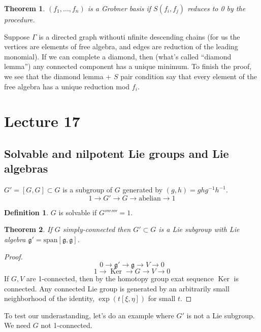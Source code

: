 \documentclass[12 pt]{article}
\DeclareMathOperator {\Ker} {Ker}
\theoremstyle{plain}
\newtheorem*{thm*}{Theorem}
\theoremstyle{definition}
\newtheorem{defn}{Definition}
\theoremstyle{remark}
\begin{document}
\begin{thm*}
$(f_1, \dots , f_n)$ is a Grobner basis if $S(f_i, f_j)$ reduces to 0 by the procedure.
\end{thm*}
Suppose $\Gamma$ is a directed graph withouti nfinite descending chains (for us the vertices are elements of free algebra, and edges are reduction of the leading monomial). If we can complete a diamond, then (what's called ``diamond lemma'') any connected component has a unique minimum. To finish the proof, we see that the diamond lemma + $S$ pair condition say that every element of the free algebra has a unique reduction mod $f_i$.




\section*{Lecture 17}
\subsection*{Solvable and nilpotent Lie groups and Lie algebras}
$G' = [G,G] \subset G$ is a subgroup of $G$ generated by $(g,h) = ghg^{-1}h^{-1}$.
\[          1 \to G' \to G \to \text{abelian} \to 1          \]
\begin{defn}
$G$ is solvable if $G'''''''' = 1$.
\end{defn}
\begin{thm*} If $G$ simply-connected then $G'\subset G$ is a Lie subgroup with Lie algebra $\mathfrak{g}' = \text{span}[\mathfrak{g} , \mathfrak{g}]$.
\end{thm*}
\begin{proof}
\[       0 \to \mathfrak{g}' \to \mathfrak{g} \to V \to 0      \]
\[        1 \to \Ker \to G \to V \to 0           \]
If $G,V$ are 1-connected, then by the homotopy group exat sequence $\Ker$ is connected. Any connected Lie group is generated by an arbitrarily small neighborhood of the identity, $\exp(t[\xi, \eta])$ for small $t$.
\end{proof}
To test our underastanding, let's do an example where $G'$ is not a Lie subgroup. We need $G$ not 1-connected.
\end{document}
